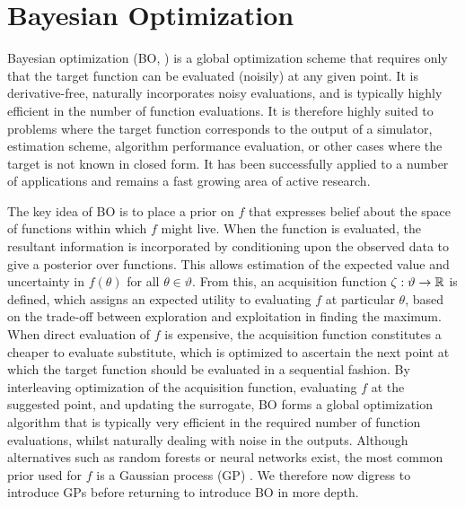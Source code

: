 
\section{Bayesian Optimization}
\label{sec:opt:BO}
Bayesian optimization (BO, \cite{jones1998efficient,osborne2009gaussian,brochu2010tutorial,shahriari2016taking})  is a 
global optimization scheme that requires only that the target
function can be evaluated (noisily) at any given point.  It is derivative-free,
naturally incorporates noisy evaluations, and is typically highly efficient 
in the number of function evaluations.  It is therefore highly suited to
problems where the target function corresponds to the output of a simulator,
estimation scheme, algorithm performance evaluation, or other cases where
the target is not known in closed form.  It has been successfully applied to 
a number of applications  and remains a fast growing area of
active research.

The key idea of BO is to place a prior on $f$ that expresses belief about the space of functions within which $f$ might live.  When the function is evaluated, the resultant information is incorporated by conditioning upon the observed data to give a posterior over functions.  
This allows estimation of the expected value and uncertainty in $f\left(\theta\right)$ for all $\theta \in \vartheta$.  
From this, an acquisition function $\zeta : \vartheta \rightarrow \mathbb{R}$ is defined, which assigns an expected utility to evaluating $f$ at particular $\theta$, based on the trade-off between exploration and exploitation in finding the maximum.  When direct evaluation of $f$ is expensive, the acquisition function constitutes a cheaper to evaluate substitute, which is optimized to ascertain the next point at which the target function should be evaluated in a sequential fashion.  By interleaving optimization of the acquisition function, evaluating $f$ at the suggested point, and updating the surrogate, BO forms a global optimization algorithm that is typically very efficient in the required number of function evaluations, whilst naturally dealing with noise in the outputs.  Although alternatives such as random forests \citep{bergstra2011algorithms,hutter2011sequential} or neural networks \citep{snoek2015scalable} exist, the most common prior used for $f$ is a Gaussian process (GP) \citep{rasmussen2006gaussian}.
We therefore now digress to introduce GPs before returning to introduce
BO in more depth.